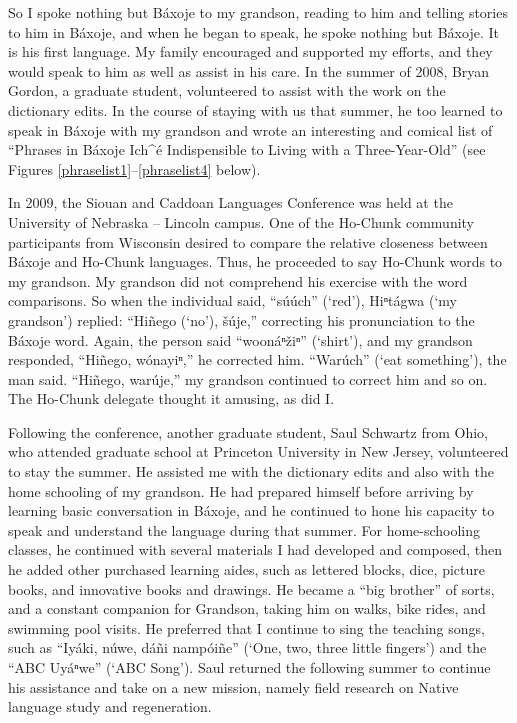 \documentclass[output=paper]{LSP/langsci}
\begin{document}
So I spoke nothing but Báxoje to my grandson, reading to him and telling stories to him in Báxoje, and when he began to speak, he spoke nothing but Báxoje. It is his first language. My family encouraged and supported my efforts, and they would speak to him as well as assist in his care. In the summer of 2008, Bryan Gordon, a graduate student, volunteered to assist with the work on the dictionary edits. In the course of staying with us that summer, he too learned to speak in Báxoje with my grandson and wrote an interesting and comical list of ``Phrases in Báxoje Ich\^{ }é Indispensible to Living with a Three-Year-Old'' (see Figures \ref{phraselist1}--\ref{phraselist4} below).

In 2009, the Siouan and Caddoan Languages Conference was held at the University of Nebraska -- Lincoln campus. One of the Ho-Chunk community participants from Wisconsin desired to compare the relative closeness between Báxoje and Ho-Chunk languages. Thus, he proceeded to say Ho-Chunk words to my grandson. My grandson did not comprehend his exercise with the word comparisons. So when the individual said, ``súúch'' (`red'), Hiⁿtágwa (`my grandson') replied: ``Hiñego (`no'), šúje,'' correcting his pronunciation to the Báxoje word. Again, the person said ``woonáⁿ\v{z}iⁿ'' (`shirt'), and my grandson responded, ``Hiñego, wónayiⁿ,'' he corrected him. ``Warúch'' (`eat something'), the man said. ``Hiñego, warúje,'' my grandson continued to correct him and so on. The Ho-Chunk delegate thought it amusing, as did I.

Following the conference, another graduate student, Saul Schwartz from Ohio, who attended graduate school at Princeton University in New Jersey, volunteered to stay the summer. He assisted me with the dictionary edits and also with the home schooling of my grandson. He had prepared himself before arriving by learning basic conversation in Báxoje, and he continued to hone his capacity to speak and understand the language during that summer. For home-schooling classes, he continued with several materials I had developed and composed, then he added other purchased learning aides, such as lettered blocks, dice, picture books, and innovative books and drawings. He became a ``big brother'' of sorts, and a constant companion for Grandson, taking him on walks, bike rides, and swimming pool visits. He preferred that I continue to sing the teaching songs, such as ``Iyáki, núwe, dáñi nampóiñe'' (`One, two, three little fingers') and the ``ABC Uyáⁿwe'' (`ABC Song'). Saul returned the following summer to continue his assistance and take on a new mission, namely field research on Native language study and regeneration.  
\end{document}
